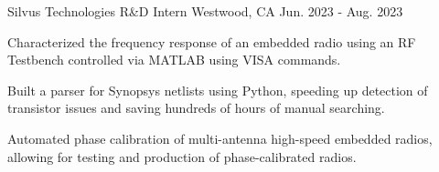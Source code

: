  \begin{cventry}
    {Silvus Technologies} %
    {R\&D Intern} %
    {Westwood, CA} %
    {Jun. 2023 - Aug. 2023} %
    {
      \begin{cvitems} %
        \item {
        Characterized the frequency response of an embedded radio using an RF Testbench controlled via MATLAB using VISA commands.
        }
        \item {
        Built a parser for Synopsys netlists using Python, speeding up detection of transistor issues and saving hundreds of hours of manual searching.
        }
        \item {
        Automated phase calibration of multi-antenna high-speed embedded radios, allowing for testing and production of phase-calibrated radios.
        }
      \end{cvitems}
    }
  \end{cventry}
